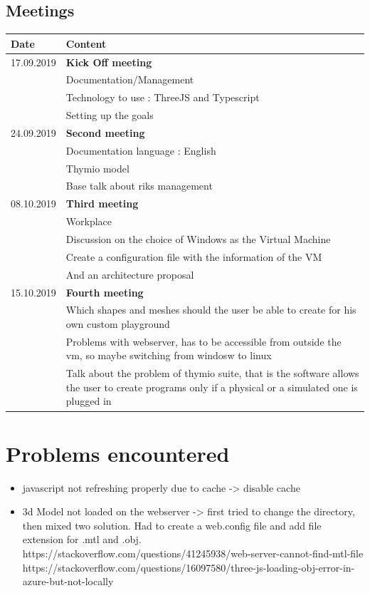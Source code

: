 \documentclass{scrartcl}
\begin{document}
\subsection{Meetings}
\begin{tabular}{ | m{3cm} | m{10cm} | }
  \hline
  Date & Content \\
  \hline
  17.09.2019 & \textbf{Kick Off meeting}\\
  & Documentation/Management\\
  & Technology to use : ThreeJS and Typescript\\
  & Setting up the goals\\
  \hline
  24.09.2019 & \textbf{Second meeting} \\
  & Documentation language : English \\
  & Thymio model \\
  & Base talk about riks management \\
  \hline
  08.10.2019 & \textbf{Third meeting}\\
  & Workplace\\
  & Discussion on the choice of Windows as the Virtual Machine \\
  & Create a configuration file with the information of the VM \\
  & And an architecture proposal \\
  \hline
  15.10.2019 & \textbf{Fourth meeting} \\
  & Which shapes and meshes should the user be able to create for his own custom playground \\
  & Problems with webserver, has to be accessible from outside the vm, so maybe switching from windosw to linux \\
  & Talk about the problem of thymio suite, that is the software allows the user to create programs only if a physical or a simulated one is plugged in \\
  \hline
\end{tabular}

\listoffigures

\listoftables

\section{Problems encountered}
\begin{itemize}
  \item javascript not refreshing properly due to cache -> disable cache
  \item 3d Model not loaded on the webserver -> first tried to change the directory, then mixed two solution. 
        Had to create a web.config file and add file extension for .mtl and .obj.
        https://stackoverflow.com/questions/41245938/web-server-cannot-find-mtl-file
        https://stackoverflow.com/questions/16097580/three-js-loading-obj-error-in-azure-but-not-locally
\end{itemize}

\printbibliography[heading=bibintoc]
\end{document}
